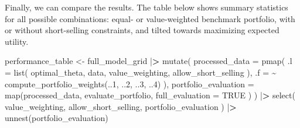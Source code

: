\documentclass[
]{krantz}
\newenvironment{Shaded}{\begin{snugshade}}{\end{snugshade}}
\newcommand{\AttributeTok}[1]{\textcolor[rgb]{0.61,0.61,0.61}{#1}}
\newcommand{\ConstantTok}[1]{\textcolor[rgb]{0,0,0}{#1}}
\newcommand{\DecValTok}[1]{\textcolor[rgb]{0.06,0.06,0.06}{#1}}
\newcommand{\ErrorTok}[1]{\textcolor[rgb]{0.14,0.14,0.14}{\textbf{#1}}}
\newcommand{\FunctionTok}[1]{\textcolor[rgb]{0,0,0}{#1}}
\newcommand{\NormalTok}[1]{#1}
\newcommand{\OtherTok}[1]{\textcolor[rgb]{0.37,0.37,0.37}{#1}}
\newcommand{\SpecialCharTok}[1]{\textcolor[rgb]{0,0,0}{#1}}
\begin{document}
Finally, we can compare the results. The table below shows summary statistics for all possible combinations: equal- or value-weighted benchmark portfolio, with or without short-selling constraints, and tilted towards maximizing expected utility.

\begin{Shaded}
\begin{Highlighting}[]
\NormalTok{performance\_table }\OtherTok{\textless{}{-}}\NormalTok{ full\_model\_grid }\SpecialCharTok{|}\ErrorTok{\textgreater{}}
  \FunctionTok{mutate}\NormalTok{(}
    \AttributeTok{processed\_data =} \FunctionTok{pmap}\NormalTok{(}
      \AttributeTok{.l =} \FunctionTok{list}\NormalTok{(}
\NormalTok{        optimal\_theta,}
\NormalTok{        data,}
\NormalTok{        value\_weighting,}
\NormalTok{        allow\_short\_selling}
\NormalTok{      ),}
      \AttributeTok{.f =} \SpecialCharTok{\textasciitilde{}} \FunctionTok{compute\_portfolio\_weights}\NormalTok{(..}\DecValTok{1}\NormalTok{, ..}\DecValTok{2}\NormalTok{, ..}\DecValTok{3}\NormalTok{, ..}\DecValTok{4}\NormalTok{)}
\NormalTok{    ),}
    \AttributeTok{portfolio\_evaluation =} \FunctionTok{map}\NormalTok{(processed\_data,}
\NormalTok{      evaluate\_portfolio,}
      \AttributeTok{full\_evaluation =} \ConstantTok{TRUE}
\NormalTok{    )}
\NormalTok{  ) }\SpecialCharTok{|}\ErrorTok{\textgreater{}}
  \FunctionTok{select}\NormalTok{(}
\NormalTok{    value\_weighting,}
\NormalTok{    allow\_short\_selling,}
\NormalTok{    portfolio\_evaluation}
\NormalTok{  ) }\SpecialCharTok{|}\ErrorTok{\textgreater{}}
  \FunctionTok{unnest}\NormalTok{(portfolio\_evaluation)}


\end{Highlighting}
\end{Shaded}
\end{document}
